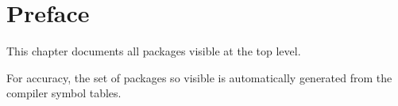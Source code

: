 \section{Preface}

%
%

This chapter documents all packages visible at the top level.

For accuracy, the set of packages so visible is automatically generated from the 
compiler symbol tables.

